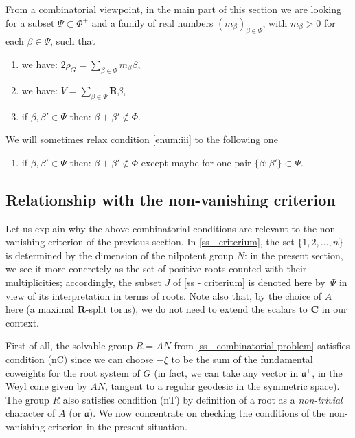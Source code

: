 \documentclass[JEP,XML,SOM,Unicode,published]{cedram}
\newenvironment{enumeratei}
{\bgroup\def\theenumi{\roman{enumi}}\def\theenumii{\arabic{enumii}}\begin{enumerate}}
{\end{enumerate}\egroup}
\newcommand{\fra}{\mathfrak{a}}
\newcommand{\CC}{\mathbf{C}}
\newcommand{\RR}{\mathbf{R}}
\theoremstyle{plain}
\theoremstyle{remark}
\theoremstyle{definition}
\begin{document}
From a combinatorial viewpoint, in the main part of this section we are looking for a subset $\Psi \subset \Phi^+$ and a family of real numbers $(m_\beta)_{\beta \in \Psi}$, with $m_\beta > 0$ for each $\beta \in \Psi$, such that

\begin{enumeratei}
\item\label{enum:i}
we have: $2\rho_G = \sum_{\beta \in \Psi} m_\beta \beta$,
\item\label{enum:ii}
we have: $V = \sum_{\beta \in \Psi} \RR \beta$,
\item\label{enum:iii}
if $\beta, \beta' \in \Psi$ then: $\beta+\beta' \not\in \Phi$.
\end{enumeratei}

We will sometimes relax condition \eqref{enum:iii} to the following one

\begin{enumerate}\renewcommand{\theenumi}{\roman{enumi}$'$}
\setcounter{enumi}{2}
\item\label{enum:iii'}
if $\beta, \beta' \in \Psi$ then: $\beta+\beta' \not\in \Phi$ except maybe for one pair $\{ \beta;\beta' \} \subset \Psi$.
\end{enumerate}

\subsection{Relationship with the non-vanishing criterion}
Let us explain why the above combinatorial conditions are relevant to the non-vanishing criterion of the previous section.
In \ref{ss - criterium}, the set $\{1, 2,\dots, n \}$ is determined by the dimension of the nilpotent group $N$: in the present section, we see it more concretely as the set of positive roots counted with their multiplicities; accordingly, the subset $J$ of \ref{ss - criterium} is denoted here by~$\Psi$ in view of its interpretation in terms of roots.
Note also that, by the choice of $A$ here (a maximal $\RR$-split torus), we do not need to extend the scalars to $\CC$ in our context.

First of all, the solvable group $R=AN$ from \ref{ss - combinatorial problem} satisfies condition (nC) since we can choose $-\xi$ to be the sum of the fundamental coweights for the root system of $G$ (in fact, we can take any vector in $\fra^+$, \ie in the Weyl cone given by $AN$, tangent to a regular geodesic in the symmetric space).
The group $R$ also satisfies condition (nT) by definition of a root as a \emph{non-trivial} character of $A$ (or $\fra$).
We now concentrate on checking the conditions of the non-vanishing criterion in the present situation.
\end{document}
